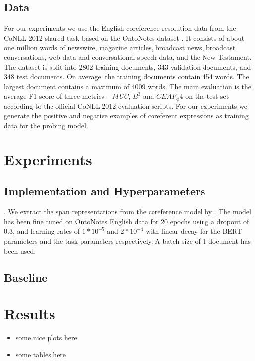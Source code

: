 \documentclass[11pt]{article}
\begin{document}
\subsection{Data} 
For our experiments we use the English coreference resolution data
from the CoNLL-2012 shared task based on the OntoNotes dataset \parencite{conll}. It consists of about one million words of newswire, magazine articles, broadcast news, broadcast conversations, web data and conversational speech data, and the New Testament. The dataset is split into 2802 training documents, 343 validation documents, and 348 test documents. On average, the training documents contain 454 words. The largest document contains a maximum of 4009 words. The main evaluation is the average F1 score of three metrics – \textit{MUC}, $B^3$ and $CEAF_ \phi4$ on the test set according to the official CoNLL-2012 evaluation scripts. For our experiments we generate the positive and negative examples of coreferent expressions as training data for the probing model. 


\section{Experiments}




\subsection{Implementation and Hyperparameters}. We extract the span representations from the coreference model by \textcite{joshi2019coref}. The model has been fine tuned on OntoNotes English data for 20 epochs using a dropout of 0.3, and learning rates of $1 * 10 ^{-5}$ and $2 * 10 ^{-4} $ with linear decay for the BERT parameters and the task parameters respectively. A batch size of 1 document has been used. 


\subsection{Baseline}




\section{Results}

\begin{itemize}
\item some nice plots here
\item some tables here
\end{itemize}
\end{document}
